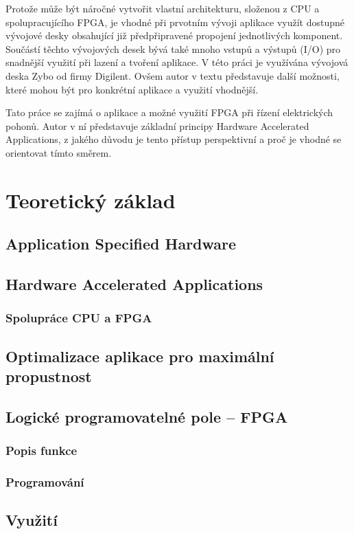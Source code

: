 \documentclass[a4paper, twoside, 11pt]{article}
\begin{document}
Protože může být náročné vytvořit vlastní architekturu, složenou z CPU a spolupracujícího FPGA, je vhodné při prvotním vývoji aplikace využít dostupné vývojové desky obsahující již předpřipravené propojení jednotlivých komponent. Součástí těchto vývojových desek bývá také mnoho vstupů a výstupů (I/O) pro snadnější využití při lazení a tvoření aplikace. V této práci je využívána vývojová deska Zybo od firmy Digilent. Ovšem autor v textu představuje další možnosti, které mohou být pro konkrétní aplikace a využití vhodnější.\par
Tato práce se zajímá o aplikace a možné využití FPGA při řízení elektrických pohonů. Autor v ní představuje základní principy Hardware Accelerated Applications, z jakého důvodu je tento přístup perspektivní a proč je vhodné se orientovat tímto směrem.\par
\flushbottom %
\newpage

\section{Teoretický základ}
	\subsection{Application Specified Hardware}
	\subsection{Hardware Accelerated Applications}
		\subsubsection{Spolupráce CPU a FPGA}
		\subsection{Optimalizace aplikace pro maximální propustnost}
	\subsection{Logické programovatelné pole – FPGA}
		\subsubsection{Popis funkce}
		\subsubsection{Programování}
		\subsection{Využití}
\end{document}
